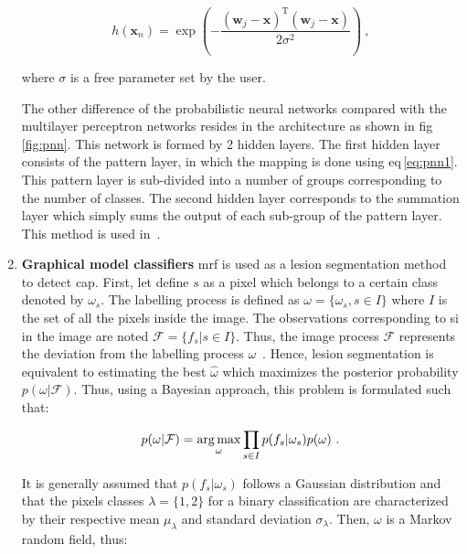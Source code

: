\begin{enumerate}[leftmargin=*]
  \begin{equation}
    h(\mathbf{x}_n) = \exp \left( - \frac{ (\mathbf{w}_j - \mathbf{x})^{\text{T}}(\mathbf{w}_j - \mathbf{x}) }{2\sigma^2} \right) \ ,
    \label{eq:pnn1}
  \end{equation}

  \noindent where $\sigma$ is a free parameter set by the user.

  The other difference of the probabilistic neural networks compared with the
  multilayer perceptron networks resides in the architecture as shown in
  \acs{fig}\,\ref{fig:pnn}.
  This network is formed by 2 hidden layers.
  The first hidden layer consists of the pattern layer, in which the mapping is
  done using \acs{eq}\,\eqref{eq:pnn1}.
  This pattern layer is sub-divided into a number of groups corresponding to
  the number of classes.
  The second hidden layer corresponds to the summation layer which simply sums
  the output of each sub-group of the pattern layer.
  This method is used in~\cite{Ampeliotis2007,Ampeliotis2008,Viswanath2011}.

\item[] \textbf{Graphical model classifiers}
  \Ac{mrf} is used as a lesion segmentation method to detect \ac{cap}.
  First, let define $s$ as a pixel which belongs to a certain class denoted by
  $\omega_s$.
  The labelling process is defined as $\omega = \{\omega_s, s \in I\}$ where
  $I$ is the set of all the pixels inside the image.
  The observations corresponding to \ac{si} in the image are noted $\mathcal{F}
  = \{ f_s | s \in I \}$.
  Thus, the image process $\mathcal{F}$ represents the deviation from the
  labelling process $\omega$~\cite{Kato2001}.
  Hence, lesion segmentation is equivalent to estimating the best
  $\hat{\omega}$ which maximizes the posterior probability
  $p(\omega|\mathcal{F})$.
  Thus, using a Bayesian approach, this problem is formulated such that:

  \begin{equation}
    p(\omega|\mathcal{F}) = \operatorname*{arg\,max}_{\omega} \prod_{s \in I} p(f_s | \omega_s) p(\omega) \ .
    \label{eq:mrf1}
  \end{equation}

  It is generally assumed that $p(f_s | \omega_s)$ follows a Gaussian
  distribution and that the pixels classes $\lambda = \{1,2\}$ for a binary
  classification are characterized by their respective mean $\mu_{\lambda}$ and
  standard deviation $\sigma_{\lambda}$.
  Then, $\omega$ is a Markov random field, thus:


\end{enumerate}
